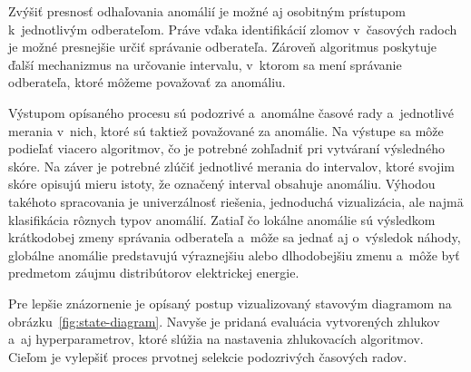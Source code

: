 \documentclass[a4paper,twoside,slovak,12pt,appendix]{article}
\begin{document}
Zvýšiť presnosť odhaľovania anomálií je možné aj osobitným prístupom
k~jednotlivým odberateľom. Práve vďaka identifikácií zlomov v~časových radoch je
možné presnejšie určiť správanie odberateľa. Zároveň algoritmus poskytuje ďalší
mechanizmus na určovanie intervalu, v~ktorom sa mení správanie odberateľa, ktoré
môžeme považovať za anomáliu.

Výstupom opísaného procesu sú podozrivé a~anomálne časové rady a~jednotlivé
merania v~nich, ktoré sú taktiež považované za anomálie. Na výstupe sa môže
podieľať viacero algoritmov, čo je potrebné zohľadniť pri vytváraní výsledného
skóre. Na záver je potrebné zlúčiť jednotlivé merania do intervalov, ktoré
svojim skóre opisujú mieru istoty, že označený interval obsahuje anomáliu.
Výhodou takéhoto spracovania je univerzálnosť riešenia, jednoduchá vizualizácia,
ale najmä klasifikácia rôznych typov anomálií. Zatiaľ čo lokálne anomálie sú
výsledkom krátkodobej zmeny správania odberateľa a~môže sa jednať aj o~výsledok
náhody, globálne anomálie predstavujú výraznejšiu alebo dlhodobejšiu zmenu
a~môže byť predmetom záujmu distribútorov elektrickej energie.

Pre lepšie znázornenie je opísaný postup vizualizovaný stavovým diagramom na
obrázku~\ref{fig:state-diagram}. Navyše je pridaná evaluácia vytvorených zhlukov
a~aj hyperparametrov, ktoré slúžia na nastavenia zhlukovacích algoritmov. Cieľom
je vylepšiť proces prvotnej selekcie podozrivých časových radov.
\end{document}
